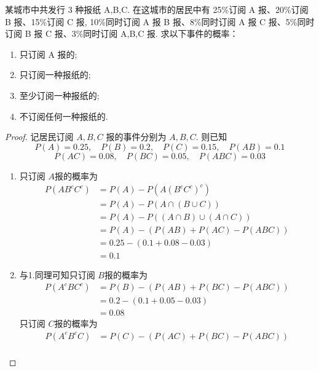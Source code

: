 \documentclass[../main.tex]{subfiles}
\begin{document}
\begin{exercise}{}{}
 某城市中共发行 3 种报纸 A,B,C. 在这城市的居民中有 25\%订阅 A 报、20\%订阅 B 报、15\%订阅 C 报, 10\%同时订阅 A 报 B 报、8\%同时订阅 A 报 C 报、5\%同时订阅 B 报 C 报、3\%同时订阅 A,B,C 报. 求以下事件的概率：
\begin{enumerate}
    \item 只订阅 A 报的;
    \item 只订阅一种报纸的;
    \item 至少订阅一种报纸的;
    \item 不订阅任何一种报纸的.
\end{enumerate}
\end{exercise}
\begin{proof}
    记居民订阅 \(  A,B,C  \) 报的事件分别为 \(  A,B,C  \). 则已知 \[
    P\left( A \right)= 0.25,\quad P\left( B \right)= 0.2 ,\quad P\left( C \right)= 0.15, \quad P\left( AB \right)= 0.1    
    \] \[
    P\left( AC \right)= 0.08 , \quad P\left( BC \right)= 0.05,  \quad P\left( ABC \right)= 0.03 
    \]
    \begin{enumerate}
        \item 只订阅 \(  A  \)报的概率为 \[
   \begin{aligned}
    P\left( AB^{c}C^{c} \right)&= P\left( A \right)-P\left( A\left( B^{c}C^{c}\right)^{c}  \right)     \\ 
     &= P\left( A \right)-P\left( A\cap \left( B\cup C \right)  \right)\\ 
      &= P\left( A \right)- P\left( \left( A\cap B \right)\cup \left( A\cap C \right)   \right)\\ 
       &= P\left( A \right)-\left( P\left( AB \right)+ P\left( AC \right)-P\left( ABC \right)    \right)\\ 
        &= 0.25-\left( 0.1+ 0.08-0.03 \right)\\ 
         &= 0.1   
   \end{aligned}
    \] 
    \item 与1.同理可知只订阅 \(  B  \)报的概率为  \[
   \begin{aligned}
    P\left( A^{c}BC^{c} \right)&= P\left( B \right)-\left( P\left( AB \right)+ P\left( BC \right)-P\left( ABC \right)    \right)\\ 
     &= 0.2-\left( 0.1+ 0.05-0.03 \right)\\ 
      &= 0.08    
   \end{aligned} 
    \] 只订阅 \(  C  \)报的概率为 \[
  \begin{aligned}
    P\left( A^{c}B^{c}C \right)&= P\left( C \right)-\left( P\left( AC \right)+ P\left( BC \right)-P\left( ABC \right)    \right)\\ 

\end{aligned}\]
\end{enumerate}
\end{proof}
\end{document}
